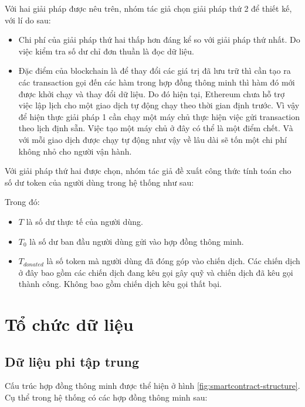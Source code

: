 \documentclass[../main-report.tex]{subfiles}
\begin{document}
Với hai giải pháp được nêu trên, nhóm tác giả chọn giải pháp thứ 2 để thiết kế, với lí do sau:

\begin{itemize}
\item Chi phí của giải pháp thứ hai thấp hơn đáng kể so với giải pháp thứ nhất. Do việc kiểm tra số dư chỉ đơn thuần là đọc dữ liệu.
\item Đặc điểm của \gls{blockchain} là để thay đổi các giá trị đã lưu trữ thì cần tạo ra các transaction gọi đến các hàm trong hợp đồng thông minh thì hàm đó mới được khởi chạy và thay đổi dữ liệu. Do đó hiện tại, Ethereum chưa hỗ trợ việc lập lịch cho một giao dịch tự động chạy theo thời gian định trước. Vì vậy để hiện thực giải pháp 1 cần chạy một máy chủ thực hiện việc gửi transaction theo lịch định sẵn. Việc tạo một máy chủ ở đây có thể là một điểm chết. Và với mỗi giao dịch được chạy tự động như vậy về lâu dài sẽ tốn một chi phí không nhỏ cho người vận hành.
\end{itemize}

Với giải pháp thứ hai được chọn, nhóm tác giả đề xuất công thức tính toán cho số dư token của người dùng trong hệ thống như sau:


\noindent{}

Trong đó:

\begin{itemize}
\item $T$ là số dư thực tế của người dùng.
\item $T_0$ là số dư ban đầu người dùng gửi vào hợp đồng thông minh.
\item $T_{donated}$ là số token mà người dùng đã đóng góp vào chiến dịch. Các chiến dịch ở đây bao gồm các chiến dịch đang kêu gọi gây quỹ và chiến dịch đã kêu gọi thành công. Không bao gồm chiến dịch kêu gọi thất bại.
\end{itemize}

\section{Tổ chức dữ liệu}
\subsection{Dữ liệu phi tập trung}
Cấu trúc hợp đồng thông minh được thể hiện ở hình \ref{fig:smartcontract-structure}. Cụ thể trong hệ thống có các hợp đồng thông minh sau:
\end{document}
